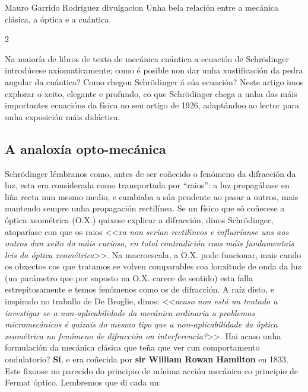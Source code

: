 \Titular*%
{De onde xorde a ecuación de Schrödinger?}%
{Mauro Garrido Rodríguez}%
{divulgacion}%
{Unha bela relación entre a mecánica clásica, a óptica e a cuántica.}%

\begin{refsection}
\begin{multicols}{2}


Na maioría de libros de texto de mecánica cuántica a ecuación de Schrödinger
introdúcese axiomaticamente; como é posible non dar unha xustificación da pedra
angular da cuántica? Como chegou Schrödinger á súa ecuación? Neste artigo imos
explorar o xeito, elegante e profundo, co que Schrödinger chega a unha das máis
importantes ecuacións da física no seu artigo de 1926, adaptándoo ao lector
para unha exposición máis didáctica.

\subsection*{A analoxía opto-mecánica}

Schrödinger lémbranos como, antes de ser coñecido o fenómeno da difracción da
luz, esta era considerada como transportada por ``raios'': a luz propagábase en
liña recta nun mesmo medio, e cambiaba a súa pendente ao pasar a outros, mais
mantendo sempre unha propagación rectilínea. Se un físico que só coñecese a
óptica xeométrica (O.X.) quixese explicar a difracción, dinos Schrödinger,
atoparíase con que os raios <<\textit{xa non serían rectilíneos e influiríanse
uns aos outros dun xeito do máis curioso, en total contradición coas máis
fundamentais leis da óptica xeométrica}>>. Na macroescala, a O.X. pode funcionar,
mais cando os obxectos cos que tratamos se volven comparables coa lonxitude de
onda da luz (un parámetro que por suposto na O.X. carece de sentido) esta falla
estrepitosamente e temos fenómenos como os de difracción. A raíz disto, e
inspirado no traballo de De Broglie, dinos: <<\textit{acaso non está un tentado a
investigar se a non-aplicabilidade da mecánica ordinaria a problemas
micromecánicos é quizais do mesmo tipo que a non-aplicabilidade da óptica
xeométrica no fenómeno de difracción ou interferencia?}>>. Hai acaso unha
formulación da mecánica clásica que teña que ver cun comportamento ondulatorio?
\textbf{Si}, e era coñecida por \textbf{sir William Rowan Hamilton} en 1833.
Este fixouse no parecido do principio de mínima acción mecánico co principio de
Fermat óptico. Lembremos que di cada un:

\begin{itemize}


\end{itemize}
\end{multicols}
\end{refsection}
